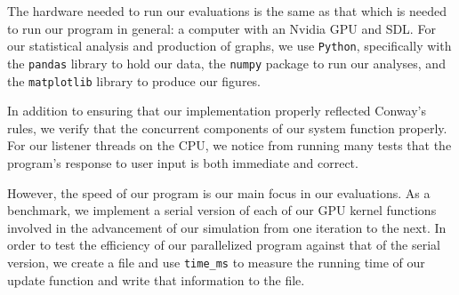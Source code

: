 \documentclass[onecolumn,12pt]{IEEEtran}
\begin{document}

  The hardware needed to run our evaluations is the same as that which is needed
  to run our program in general: a computer with an Nvidia GPU and SDL. For our
  statistical analysis and production of graphs, we use \texttt{Python},
  specifically with the \texttt{pandas} library to hold our data, the
  \texttt{numpy} package to run our analyses, and the \texttt{matplotlib} library
  to produce our figures.  

  In addition to ensuring that our implementation properly reflected Conway's
  rules, we verify that the concurrent components of our system function
  properly. For our listener threads on the CPU, we notice from running many
  tests that the program's response to user input is both immediate and correct. 

  However, the speed of our program is our main focus in our evaluations. As a
  benchmark, we implement a serial version of each of our GPU kernel functions
  involved in the advancement of our simulation from one iteration to the next.
  In order to test the efficiency of our parallelized program against that of the
  serial version, we create a file and use \texttt{time\_ms} to measure the
  running time of our update function and write that information to the file. 
\end{document}
